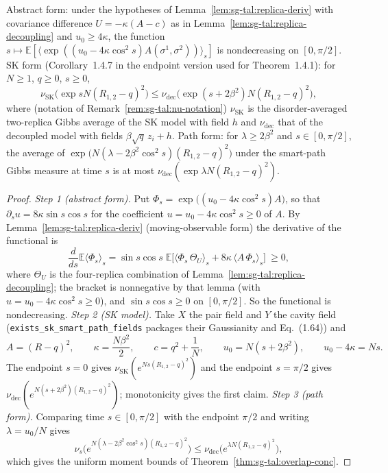 \begin{corollary}\label{cor:sg-tal:compensated-mono}
  \leanok
{}
Abstract form: under the hypotheses of Lemma~\ref{lem:sg-tal:replica-deriv} with covariance difference $U=-\kappa(A-c)$ as in Lemma~\ref{lem:sg-tal:replica-decoupling} and $u_0\ge4\kappa$, the function
$s\mapsto\mathbb{E}[\langle\exp((u_0-4\kappa\cos^2 s)A(\sigma^1,\sigma^2))\rangle_s]$ is nondecreasing on $[0,\pi/2]$.
SK form (Corollary~1.4.7 in the endpoint version used for Theorem~1.4.1): for $N\ge1$, $q\ge0$, $s\ge0$,
\[
\nu_{\mathrm{SK}}\big(\exp sN(R_{1,2}-q)^2\big) \le \nu_{\mathrm{dec}}\big(\exp (s+2\beta^2) N (R_{1,2}-q)^2\big),
\]
where (notation of Remark~\ref{rem:sg-tal:nu-notation}) $\nu_{\mathrm{SK}}$ is the disorder-averaged two-replica Gibbs average of the SK model with field $h$ and $\nu_{\mathrm{dec}}$ that of the decoupled model with fields $\beta\sqrt q\, z_i + h$.
Path form: for $\lambda\ge2\beta^2$ and $s\in[0,\pi/2]$, the average of $\exp\big(N(\lambda-2\beta^2\cos^2 s)(R_{1,2}-q)^2\big)$ under the smart-path Gibbs measure at time $s$ is at most $\nu_{\mathrm{dec}}(\exp \lambda N (R_{1,2}-q)^2)$.
\end{corollary}
\begin{proof}
\leanok
\emph{Step 1 (abstract form).} Put $\Phi_s=\exp\big((u_0-4\kappa\cos^2s)A\big)$, so that $\partial_su=8\kappa\sin s\cos s$ for the coefficient $u=u_0-4\kappa\cos^2 s\ge0$ of $A$. By Lemma~\ref{lem:sg-tal:replica-deriv} (moving-observable form) the derivative of the functional is
\[
\frac d{ds}\mathbb{E}\langle\Phi_s\rangle_s=\sin s\cos s\;\mathbb{E}\Big[\Big\langle\Phi_s\,\Theta_U\Big\rangle_s+8\kappa\,\big\langle A\,\Phi_s\big\rangle_s\Big]\ \ge0,
\]
where $\Theta_U$ is the four-replica combination of Lemma~\ref{lem:sg-tal:replica-decoupling}; the bracket is nonnegative by that lemma (with $u=u_0-4\kappa\cos^2s\ge0$), and $\sin s\cos s\ge0$ on $[0,\pi/2]$. So the functional is nondecreasing.
\emph{Step 2 (SK model).} Take $X$ the pair field and $Y$ the cavity field (\texttt{exists\_sk\_smart\_path\_fields} packages their Gaussianity and Eq.~(1.64)) and
\[
A=(R-q)^2,\qquad \kappa=\frac{N\beta^2}2,\qquad c=q^2+\frac1N,\qquad u_0=N(s+2\beta^2),\qquad u_0-4\kappa=Ns .
\]
The endpoint $s=0$ gives $\nu_{\mathrm{SK}}(e^{Ns(R_{1,2}-q)^2})$ and the endpoint $s=\pi/2$ gives $\nu_{\mathrm{dec}}(e^{N(s+2\beta^2)(R_{1,2}-q)^2})$; monotonicity gives the first claim.
\emph{Step 3 (path form).} Comparing time $s\in[0,\pi/2]$ with the endpoint $\pi/2$ and writing $\lambda=u_0/N$ gives
\[
\nu_s\Big(e^{N(\lambda-2\beta^2\cos^2s)(R_{1,2}-q)^2}\Big)\le\nu_{\mathrm{dec}}\Big(e^{\lambda N(R_{1,2}-q)^2}\Big),
\]
which gives the uniform moment bounds of Theorem~\ref{thm:sg-tal:overlap-conc}.
\end{proof}

